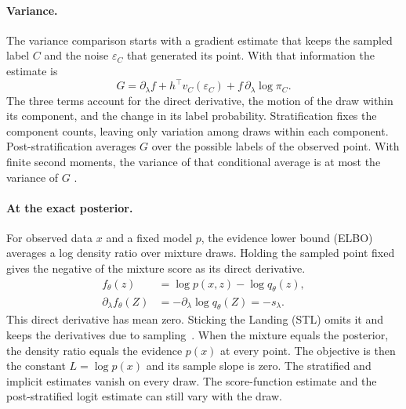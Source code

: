 \paragraph*{Variance.}
The variance comparison starts with a gradient estimate that keeps the
sampled label $C$ and the noise $\varepsilon_C$ that generated its point.
With that information the estimate is
\begin{equation}
 G = \partial_\lambda f + h^\top v_C(\varepsilon_C)
     + f\,\partial_\lambda\log\pi_C .
 \label{eq:label-gradient}
\end{equation}
The three terms account for the direct derivative, the motion of the draw
within its component, and the change in its label probability.
Stratification fixes the component counts, leaving only variation among
draws within each component. Post-stratification averages $G$ over the
possible labels of the observed point. With finite second moments, the
variance of that conditional average is at most the variance of $G$
\citep{burroni2026mixture}.

\paragraph*{At the exact posterior.}
For observed data $x$ and a fixed model $p$, the evidence lower bound
(ELBO) averages a log density ratio over mixture draws. Holding the sampled
point fixed gives the negative of the mixture score as its direct derivative.
\begin{align*}
 f_\theta(z) &= \log p(x,z)-\log q_\theta(z),\\
 \partial_\lambda f_\theta(Z) &= -\partial_\lambda\log q_\theta(Z) = -s_\lambda .
\end{align*}
This direct derivative has mean zero. Sticking the Landing (STL) omits it
and keeps the derivatives due to sampling~\citep{roeder2017stl}. When the
mixture equals the posterior, the density ratio equals the evidence $p(x)$
at every point. The objective is then the constant $L=\log p(x)$ and its
sample slope is zero. The stratified and implicit estimates vanish on every
draw. The score-function estimate and the post-stratified logit estimate can
still vary with the draw.
